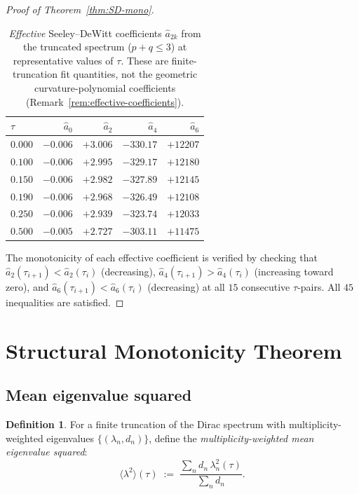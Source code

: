\documentclass[12pt]{article}
\theoremstyle{definition}
\newtheorem{definition}[theorem]{Definition}
\theoremstyle{remark}
\begin{document}
\begin{proof}[Proof of Theorem~\ref{thm:SD-mono}]
\begin{table}[htbp]
\centering
\caption{\emph{Effective} Seeley--DeWitt coefficients $\hat{a}_{2k}$ from the
  truncated spectrum ($p+q \leq 3$) at representative values of $\tau$.
  These are finite-truncation fit quantities, not the geometric
  curvature-polynomial coefficients (Remark~\ref{rem:effective-coefficients}).}
\label{tab:SD-coefficients}
\begin{tabular}{@{}l r r r r@{}}
\toprule
$\tau$ & $\hat{a}_0$ & $\hat{a}_2$ & $\hat{a}_4$ & $\hat{a}_6$ \\
\midrule
$0.000$ & $-0.006$ & $+3.006$ & $-330.17$ & $+12207$ \\
$0.100$ & $-0.006$ & $+2.995$ & $-329.17$ & $+12180$ \\
$0.150$ & $-0.006$ & $+2.982$ & $-327.89$ & $+12145$ \\
$0.190$ & $-0.006$ & $+2.968$ & $-326.49$ & $+12108$ \\
$0.250$ & $-0.006$ & $+2.939$ & $-323.74$ & $+12033$ \\
$0.500$ & $-0.005$ & $+2.727$ & $-303.11$ & $+11475$ \\
\bottomrule
\end{tabular}
\end{table}

The monotonicity of each effective coefficient is verified by checking
that $\hat{a}_2(\tau_{i+1}) < \hat{a}_2(\tau_i)$ (decreasing),
$\hat{a}_4(\tau_{i+1}) > \hat{a}_4(\tau_i)$ (increasing toward zero),
and $\hat{a}_6(\tau_{i+1}) < \hat{a}_6(\tau_i)$ (decreasing) at all
$15$ consecutive $\tau$-pairs.  All $45$ inequalities are satisfied.
\end{proof}


\section{Structural Monotonicity Theorem}\label{sec:structural}

\subsection{Mean eigenvalue squared}

\begin{definition}\label{def:mean-lambda}
For a finite truncation of the Dirac spectrum with multiplicity-weighted
eigenvalues $\{(\lambda_n, d_n)\}$, define the
\emph{multiplicity-weighted mean eigenvalue squared}:
\begin{equation}\label{eq:mean-lambda-sq}
  \langle\lambda^2\rangle(\tau) \;:=\;
  \frac{\sum_n d_n\, \lambda_n^2(\tau)}{\sum_n d_n}.
\end{equation}
\end{definition}
\end{document}

